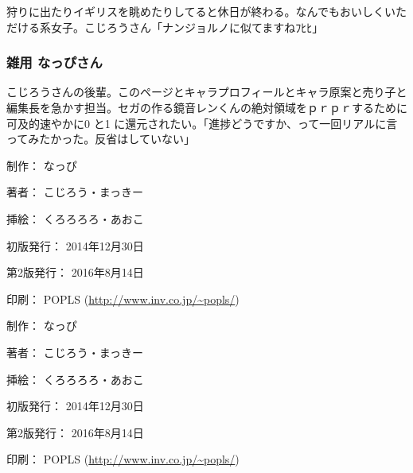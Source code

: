 \documentclass[9pt,b5paper,tombo,openany,dvipdfmx]{jsbook}
\begin{document}
\begin{minipage}{0.5\hsize}
\begin{scriptsize}
		狩りに出たりイギリスを眺めたりしてると休日が終わる。なんでもおいしくいただける系女子。こじろうさん「ナンジョルノに似てますねﾌﾋﾋ」

		\subsubsection*{雑用 なっぴさん}

		こじろうさんの後輩。このページとキャラプロフィールとキャラ原案と売り子と編集長を急かす担当。セガの作る鏡音レンくんの絶対領域をｐｒｐｒするために可及的速やかに0 と1 に還元されたい。「進捗どうですか、って一回リアルに言ってみたかった。反省はしていない」

	\end{scriptsize}
\end{minipage}

\begin{minipage}{0.6\hsize}
	\begin{small}
		\begin{description}
			\item{制作：} なっぴ
			\item{著者：} こじろう・まっきー
			\item{挿絵：} くろろろろ・あおこ
			\item{初版発行：} 2014年12月30日
			\item{第2版発行：} 2016年8月14日
			\item{印刷：} POPLS (\url{http://www.inv.co.jp/~popls/})
		\end{description}
	\end{small}
\end{minipage}

\newpage

\begin{minipage}{0.6\hsize}
	\begin{small}
		\begin{description}
			\item{制作：} なっぴ
			\item{著者：} こじろう・まっきー
			\item{挿絵：} くろろろろ・あおこ
			\item{初版発行：} 2014年12月30日
			\item{第2版発行：} 2016年8月14日
			\item{印刷：} POPLS (\url{http://www.inv.co.jp/~popls/})
		\end{description}
	\end{small}
\end{minipage}
\end{document}
